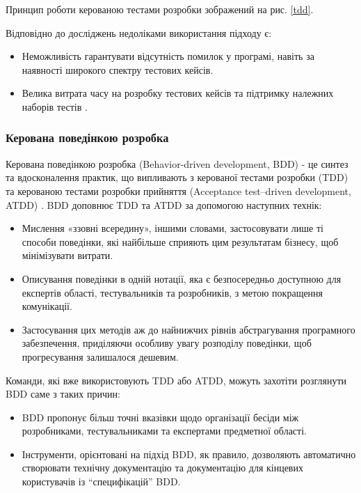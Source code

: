 Принцип роботи керованою тестами розробки зображений на рис. \ref{tdd}.

Відповідно до досліджень недоліками використання підходу є:

\begin{itemize}
		\item Неможливість гарантувати відсутність помилок у програмі,
			навіть за наявності широкого спектру тестових кейсів.
		\item Велика витрата часу на розробку тестових кейсів
			та підтримку належних наборів тестів \cite{tdd-thesis}.
\end{itemize}


\subsubsection{Керована поведінкою розробка}

Керована поведінкою розробка (Behavior-driven development, BDD) 
- це синтез та вдосконалення практик, що випливають з
керованої тестами розробки (TDD) та керованою тестами розробки прийняття
(Acceptance test–driven development, ATDD) \cite{bdd-article}.
BDD доповнює TDD та ATDD за допомогою наступних технік:

\begin{itemize}
		\item Мислення «ззовні всередину», іншими словами, застосовувати
			лише ті способи поведінки, які найбільше сприяють цим результатам бізнесу,
			щоб мінімізувати витрати.
		\item Описування поведінки в одній нотації,
			яка є безпосередньо доступною для експертів області,
			тестувальників та розробників, з метою покращення комунікації.
		\item Застосування цих методів аж до найнижчих рівнів абстрагування
			програмного забезпечення, приділяючи особливу увагу розподілу поведінки,
			щоб прогресування залишалося дешевим.
\end{itemize}

Команди, які вже використовують TDD або ATDD, 
можуть захотіти розглянути BDD саме з таких причин:

\begin{itemize}
		\item BDD пропонує більш точні вказівки щодо організації бесіди між розробниками,
			тестувальниками та експертами предметної області.
		\item Інструменти, орієнтовані на підхід BDD, як правило,
			дозволяють автоматично створювати технічну документацію
			та документацію для кінцевих користувачів із “специфікацій” BDD.
\end{itemize}

